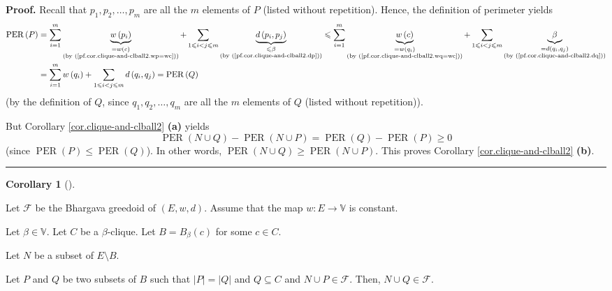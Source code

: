 \documentclass[numbers=enddot,12pt,final,onecolumn,notitlepage]{scrartcl}%
\theoremstyle{definition}
\newtheorem{coro}[theo]{Corollary}
\newenvironment{corollary}[1][]
{\begin{coro}[#1]\begin{leftbar}}
{\end{leftbar}\end{coro}}
\newenvironment{proof}[1][Proof]{\noindent\textbf{#1.} }{\ \rule{0.5em}{0.5em}}
\let\sumnonlimits\sum
\renewcommand{\sum}{\sumnonlimits\limits}
\renewcommand{\leq}{\leqslant}
\renewcommand{\geq}{\geqslant}
\theoremstyle{plainsl}
\begin{document}
\begin{proof}
Recall that $p_{1},p_{2},\ldots,p_{m}$ are all the $m$ elements of $P$ (listed
without repetition). Hence, the definition of perimeter yields%
\begin{align*}
\operatorname*{PER}\left(  P\right)   &  =\sum_{i=1}^{m}\underbrace{w\left(
p_{i}\right)  }_{\substack{=w\left(  c\right)  \\\text{(by
(\ref{pf.cor.clique-and-clball2.wp=wc}))}}}+\sum_{1\leq i<j\leq m}%
\underbrace{d\left(  p_{i},p_{j}\right)  }_{\substack{\leq\beta\\\text{(by
(\ref{pf.cor.clique-and-clball2.dp}))}}}\leq\sum_{i=1}^{m}\underbrace{w\left(
c\right)  }_{\substack{=w\left(  q_{i}\right)  \\\text{(by
(\ref{pf.cor.clique-and-clball2.wq=wc}))}}}+\sum_{1\leq i<j\leq m}%
\underbrace{\beta}_{\substack{=d\left(  q_{i},q_{j}\right)  \\\text{(by
(\ref{pf.cor.clique-and-clball2.dq}))}}}\\
&  =\sum_{i=1}^{m}w\left(  q_{i}\right)  +\sum_{1\leq i<j\leq m}d\left(
q_{i},q_{j}\right)  =\operatorname*{PER}\left(  Q\right)
\end{align*}
(by the definition of $Q$, since $q_{1},q_{2},\ldots,q_{m}$ are all the $m$
elements of $Q$ (listed without repetition)).

But Corollary \ref{cor.clique-and-clball2} \textbf{(a)} yields
\[
\operatorname*{PER}\left(  N\cup Q\right)  -\operatorname*{PER}\left(  N\cup
P\right)  =\operatorname*{PER}\left(  Q\right)  -\operatorname*{PER}\left(
P\right)  \geq0
\]
(since $\operatorname*{PER}\left(  P\right)  \leq\operatorname*{PER}\left(
Q\right)  $). In other words, $\operatorname*{PER}\left(  N\cup Q\right)
\geq\operatorname*{PER}\left(  N\cup P\right)  $. This proves Corollary
\ref{cor.clique-and-clball2} \textbf{(b)}.
\end{proof}

\begin{corollary}
\label{cor.clique-and-clball3}Let $\mathcal{F}$ be the Bhargava greedoid of
$\left(  E,w,d\right)  $. Assume that the map $w:E\rightarrow\mathbb{V}$ is constant.

Let $\beta\in\mathbb{V}$. Let $C$ be a $\beta$-clique. Let $B=B_{\beta}\left(
c\right)  $ for some $c\in C$.

Let $N$ be a subset of $E\setminus B$.

Let $P$ and $Q$ be two subsets of $B$ such that $\left\vert P\right\vert
=\left\vert Q\right\vert $ and $Q\subseteq C$ and $N\cup P\in\mathcal{F}$.
Then, $N\cup Q\in\mathcal{F}$.
\end{corollary}
\end{document}
